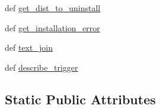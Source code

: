 \begin{DoxyCompactItemize}
\item 
def \hyperlink{classpip_1_1__internal_1_1resolution_1_1resolvelib_1_1factory_1_1Factory_a4ed9efbef6e3dfe83659d1e4ae395e62}{get\+\_\+dist\+\_\+to\+\_\+uninstall}
\item 
def \hyperlink{classpip_1_1__internal_1_1resolution_1_1resolvelib_1_1factory_1_1Factory_adeea009e622ce8363eb18e40cb9c11f8}{get\+\_\+installation\+\_\+error}
\item 
def \hyperlink{classpip_1_1__internal_1_1resolution_1_1resolvelib_1_1factory_1_1Factory_a502d5d21fe6921a4009122723d458613}{text\+\_\+join}
\item 
def \hyperlink{classpip_1_1__internal_1_1resolution_1_1resolvelib_1_1factory_1_1Factory_a9374e7f3e7ee336257c07415a330edee}{describe\+\_\+trigger}
\end{DoxyCompactItemize}
\subsection*{Static Public Attributes}
